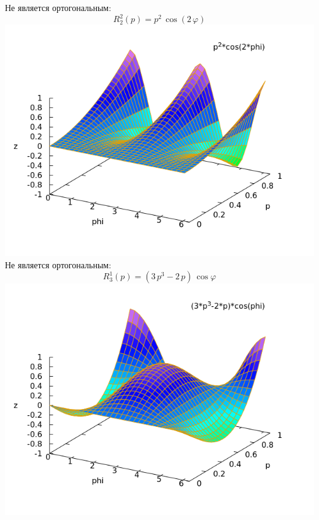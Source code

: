 \documentclass[pdf, unicode, 12pt, a4paper,oneside,fleqn]{article}
\begin{document}
Не является ортогональным:$$R^{2}_{2}(p) = p^2\,\cos \left(2\,\varphi\right)$$
\includegraphics[scale=0.5]{./graph4.png}\\
Не является ортогональным:$$R^{1}_{3}(p) = \left(3\,p^3-2\,p\right)\,\cos \varphi$$
\includegraphics[scale=0.5]{./graph5.png}\\
\end{document}

